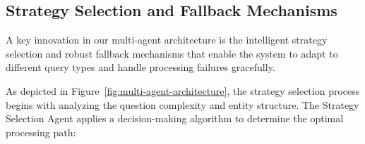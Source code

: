 \subsection{Strategy Selection and Fallback Mechanisms}
\label{strategy-fallback}
A key innovation in our multi-agent architecture is the intelligent strategy selection and robust fallback mechanisms that enable the system to adapt to different query types and handle processing failures gracefully.


As depicted in Figure~\ref{fig:multi-agent-architecture}, the strategy selection process begins with analyzing the question complexity and entity structure. The Strategy Selection Agent applies a decision-making algorithm to determine the optimal processing path:

